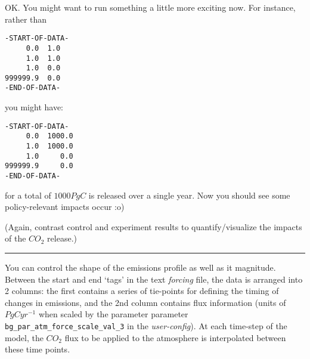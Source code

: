 \documentclass[11pt,fleqn]{book} %
\begin{document}
\noindent OK. You might want to run something a little more exciting now. For instance, rather than
\vspace{-2pt}\small\begin{verbatim}
-START-OF-DATA-
     0.0  1.0
     1.0  1.0
     1.0  0.0
999999.9  0.0
-END-OF-DATA-
\end{verbatim}\normalsize\vspace{-2pt}
you might have:
\vspace{-2pt}\small\begin{verbatim}
-START-OF-DATA-
     0.0  1000.0
     1.0  1000.0
     1.0     0.0
999999.9     0.0
-END-OF-DATA-
\end{verbatim}\normalsize\vspace{-2pt}
for a total of \(1000 PgC\) is released over a single year. Now you should see some policy-relevant impacts occur :o)

\noindent (Again, contrast control and experiment results to quantify/visualize the impacts of the \(CO_{2}\) release.)

\vspace{1mm}
\noindent\rule{4cm}{0.1mm}
\vspace{2mm}

\noindent You can control the shape of the emissions profile as well as it magnitude. Between the start and end ‘tags’ in the text \textit{forcing} file, the data is arranged into 2 columns: the first contains a series of tie-points for defining the timing of changes in emissions, and the 2nd column contains flux information (units of \(PgC yr^{-1}\) when scaled by the parameter parameter \texttt{bg\_par\_atm\_force\_scale\_val\_3} in the \textit{user-config}). At each time-step of the model, the \(CO_{2}\) flux to be applied to the atmosphere is interpolated between these time points.
\end{document}
